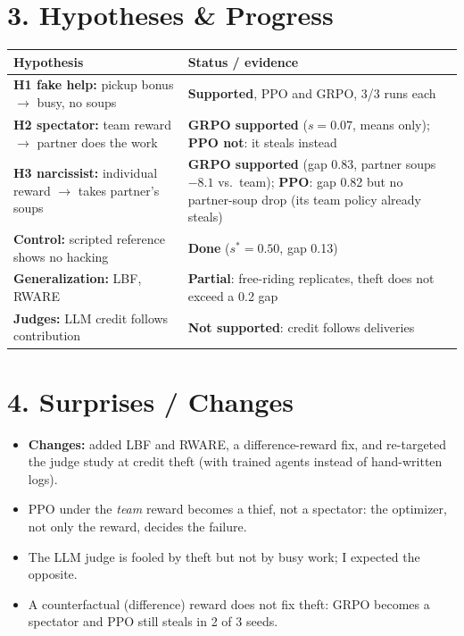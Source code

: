 \documentclass[10pt]{article}
\begin{document}
\section*{3. Hypotheses \& Progress}
\begin{center}\small
\renewcommand{\arraystretch}{1.15}
\begin{tabular}{@{}p{} p{}@{}}
\toprule
Hypothesis & Status / evidence \\
\midrule
\textbf{H1 fake help:} pickup bonus $\to$ busy, no soups & \textbf{Supported}, PPO and GRPO, 3/3 runs each \\
\textbf{H2 spectator:} team reward $\to$ partner does the work & \textbf{GRPO supported} ($s=0.07$, means only); \textbf{PPO not}: it steals instead \\
\textbf{H3 narcissist:} individual reward $\to$ takes partner's soups & \textbf{GRPO supported} (gap 0.83, partner soups $-8.1$ vs.\ team); \textbf{PPO}: gap 0.82 but no partner-soup drop (its team policy already steals) \\
\textbf{Control:} scripted reference shows no hacking & \textbf{Done} ($s^*=0.50$, gap 0.13) \\
\textbf{Generalization:} LBF, RWARE & \textbf{Partial}: free-riding replicates, theft does not exceed a 0.2 gap \\
\textbf{Judges:} LLM credit follows contribution & \textbf{Not supported}: credit follows deliveries \\
\bottomrule
\end{tabular}
\end{center}

\section*{4. Surprises / Changes}
\begin{itemize}
\item \textbf{Changes:} added LBF and RWARE, a difference-reward fix, and re-targeted the judge study
      at credit theft (with trained agents instead of hand-written logs).
\item PPO under the \emph{team} reward becomes a thief, not a spectator: the optimizer, not only the
      reward, decides the failure.
\item The LLM judge is fooled by theft but not by busy work; I expected the opposite.
\item A counterfactual (difference) reward does not fix theft: GRPO becomes a spectator and PPO still
      steals in 2 of 3 seeds.
\end{itemize}
\end{document}
